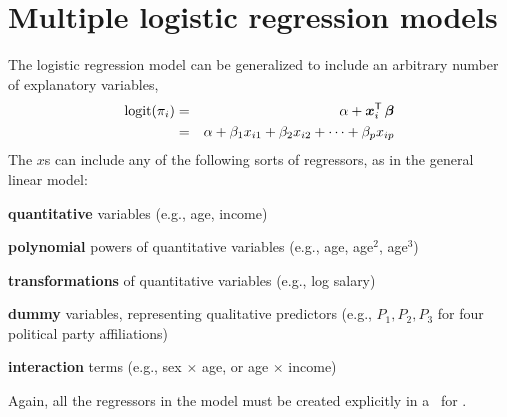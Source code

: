 \section{Multiple logistic regression models}\label{sec:logist-mult}
The logistic regression model can be generalized to include an
arbitrary number of explanatory variables,
\begin{eqnarray}
  \logit ( \pi_{i})
   &=& \alpha + \vec{x}_{i}\trans \,  \vec{\beta} \\ \label{eq:logisr}
   &=& \alpha + \beta_1 x_{i1} + \beta_2 x_{i2} + \cdots + \beta_p x_{ip}
   \nonumber
\end{eqnarray}
The $x$s can include any of the following sorts of regressors,
as in the general linear model:

\begin{itemize*}
\item \textbf{quantitative} variables (e.g., age, income)
\item \textbf{polynomial} powers of quantitative variables (e.g., age, age$^2$, age$^3$)
\item \textbf{transformations} of quantitative variables (e.g., log salary)
\item \textbf{dummy} variables, representing qualitative predictors (e.g.,
$P_1, P_2, P_3$ for four political party affiliations)
\item \textbf{interaction} terms (e.g., sex $\times$ age, or age $\times$ income)
\end{itemize*}
Again, all the regressors in the model must be created explicitly in
a \Dstp\ for .

